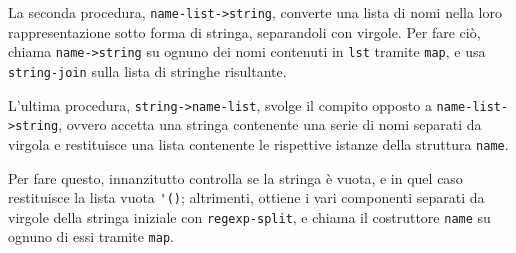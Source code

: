 La seconda procedura, \lstinline{name-list->string}, converte una lista
di nomi nella loro rappresentazione sotto forma di stringa, separandoli
con virgole. Per fare ci\`o, chiama \lstinline{name->string} su ognuno dei
nomi contenuti in \lstinline{lst} tramite \lstinline{map}, e usa
\lstinline{string-join} sulla lista di stringhe risultante.

L'ultima procedura, \lstinline{string->name-list}, svolge il compito opposto
a \lstinline{name-list->string}, ovvero accetta una stringa contenente una
serie di nomi separati da virgola e restituisce una lista contenente le
rispettive istanze della struttura \lstinline{name}.

Per fare questo, innanzitutto controlla se la stringa \`e vuota, e in quel
caso restituisce la lista vuota \lstinline{'()}; altrimenti, ottiene i vari
componenti separati da virgole della stringa iniziale con
\lstinline{regexp-split}, e chiama il costruttore \lstinline{name} su
ognuno di essi tramite \lstinline{map}.
